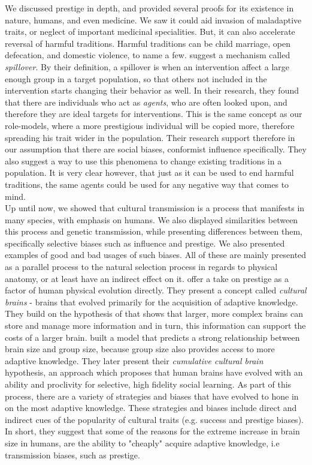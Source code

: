 \documentclass[12pt]{extarticle}
\begin{document}
We discussed prestige in depth, and provided several proofs for its existence in nature, humans, and even medicine. We saw it could aid invasion of maladaptive traits, or neglect of important medicinal specialities. But, it can also accelerate reversal of harmful traditions.
Harmful traditions can be child marriage, open defecation, and domestic violence, to name a few. 
\citet{harmful_traditions} suggest a mechanism called \textit{spillover}. By their definition, a spillover is when an intervention affect a large enough group in a target population, so that others not included in the intervention starts changing their behavior as well. In their research, they found that there are individuals who act as \textit{agents}, who are often looked upon, and therefore they are ideal targets for interventions. This is the same concept as our role-models, where a more prestigious individual will be copied more, therefore spreading his trait wider in the population. Their research support therefore in our assumption that there are social biases, conformist influence specifically. They also suggest a way to use this phenomena to change existing traditions in a population. It is very clear however, that just as it can be used to end harmful traditions, the same agents could be used for any negative way that comes to mind.\\

Up until now, we showed that cultural transmission is a process that manifests in many species, with emphasis on humans. We also displayed similarities between this process and genetic transmission, while presenting differences between them, specifically selective biases such as influence and prestige. We also presented examples of good and bad usages of such biases. All of these are mainly presented as a parallel process to the natural selection process in regards to physical anatomy, or at least have an indirect effect on it. \citet{collective_brains} offer a take on prestige as a factor of human physical evolution directly. They present a concept called \textit{cultural brains} - brains that evolved primarily for the acquisition of adaptive knowledge.
They build on the hypothesis of \citet{social_brains} that shows that larger, more complex brains can store and manage more information and in turn, this information can support the costs of a larger brain.
\citet{collective_brains} built a model that predicts a strong relationship between brain size and group size, because group size also provides access to more adaptive knowledge. They later present their \textit{cumulative cultural brain} hypothesis, an approach which proposes that human brains have evolved with an ability and proclivity for selective, high fidelity social learning. As part of this process, there are a variety of strategies and biases that have evolved to hone in on the most adaptive knowledge. These strategies and biases include direct and indirect cues of the popularity of cultural traits (e.g. success and prestige biases).
In short, they suggest that some of the reasons for the extreme increase in brain size in humans, are the ability to "cheaply" acquire adaptive knowledge, i.e transmission biases, such as prestige.

\pagebreak


\end{document}

